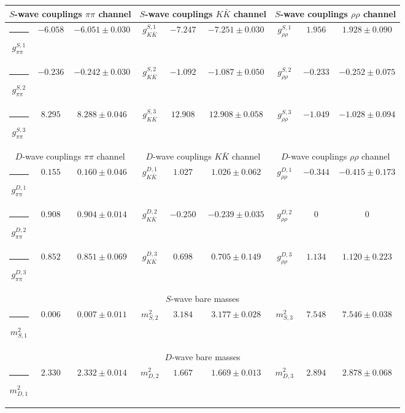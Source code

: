 \begin{table}[h]
\begin{ruledtabular}
\begin{tabular}{c c c c c c c c c}
\multicolumn{3}{c}{$S$-wave couplings $\pi \pi$ channel}  & \multicolumn{3}{c}{$S$-wave couplings $K  \bar K$ channel} & \multicolumn{3}{c}{$S$-wave couplings $\rho\rho$ channel} \\ \hline
\rule[-0.2cm]{-0.1cm}{.55cm} $g^{S,1}_{\pi\pi}$ & $-6.058$ & $-6.051 \pm 0.030$ & $g^{S,1}_{K\bar K}$ & $-7.247$ & $-7.251 \pm 0.030$ & $g^{S,1}_{\rho\rho}$ & $1.956$ & $1.928 \pm 0.090$ \\
\rule[-0.2cm]{-0.1cm}{.55cm} $g^{S,2}_{\pi\pi}$ & $-0.236$ & $-0.242 \pm 0.030$ & $g^{S,2}_{K\bar K}$ & $-1.092$ & $-1.087 \pm 0.050$ & $g^{S,2}_{\rho\rho}$ & $-0.233$ & $-0.252 \pm 0.075$ \\
\rule[-0.2cm]{-0.1cm}{.55cm} $g^{S,3}_{\pi\pi}$ & $8.295$ & $8.288 \pm 0.046$ & $g^{S,3}_{K\bar K}$ & $12.908$ & $12.908 \pm 0.058$ & $g^{S,3}_{\rho\rho}$ & $-1.049$ & $-1.028 \pm 0.094$ \\
\hline 
\multicolumn{3}{c}{$D$-wave couplings $\pi \pi$ channel}  & \multicolumn{3}{c}{$D$-wave couplings $K  \bar K$ channel} & \multicolumn{3}{c}{$D$-wave couplings $\rho\rho$ channel} \\ \hline
\rule[-0.2cm]{-0.1cm}{.55cm} $g^{D,1}_{\pi\pi}$ & $0.155$ & $0.160 \pm 0.046$ & $g^{D,1}_{K\bar K}$ & $1.027$ & $1.026 \pm 0.062$ & $g^{D,1}_{\rho\rho}$ & $-0.344$ & $-0.415 \pm 0.173$ \\
\rule[-0.2cm]{-0.1cm}{.55cm} $g^{D,2}_{\pi\pi}$ & $0.908$ & $0.904 \pm 0.014$ & $g^{D,2}_{K\bar K}$ & $-0.250$ & $-0.239 \pm 0.035$ & $g^{D,2}_{\rho\rho}$ & $0$ & $0$ \\
\rule[-0.2cm]{-0.1cm}{.55cm} $g^{D,3}_{\pi\pi}$ & $0.852$ & $0.851 \pm 0.069$ & $g^{D,3}_{K\bar K}$ & $0.698$ & $0.705 \pm 0.149$ & $g^{D,3}_{\rho\rho}$ & $1.134$ & $1.120 \pm 0.223$ \\
\hline 
\multicolumn{9}{c}{$S$-wave bare masses}   \\ \hline
\rule[-0.2cm]{-0.1cm}{.55cm} $m^2_{S,1}$ & $0.006$ & $0.007 \pm 0.011$ & $m^2_{S,2}$ & $3.184$ & $3.177 \pm 0.028$ & $m^2_{S,3}$ & $7.548$ & $7.546 \pm 0.038$ \\
\hline 
\multicolumn{9}{c}{$D$-wave bare masses}   \\ \hline
\rule[-0.2cm]{-0.1cm}{.55cm} $m^2_{D,1}$ & $2.330$ & $2.332 \pm 0.014$ & $m^2_{D,2}$ & $1.667$ & $1.669 \pm 0.013$ & $m^2_{D,3}$ & $2.894$ & $2.878 \pm 0.068$ \\

\end{tabular}
\end{ruledtabular}
\end{table}
